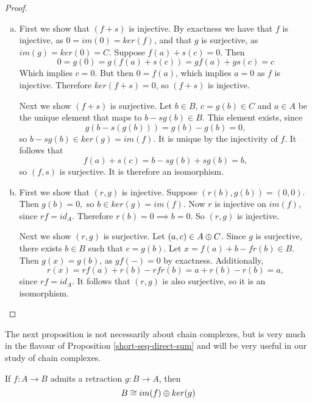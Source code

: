 \begin{proof}
\begin{enumerate}[(a)]
\item First we show that $(f+s)$ is injective. By exactness we have that $f$ is injective, as $0=im(0)=ker(f)$, and that $g$ is surjective, as $im(g)=ker(0)=C$. Suppose $f(a)+s(c)=0$. Then $$0=g(0)=g(f(a)+s(c))=gf(a)+gs(c)=c$$
Which implies $c=0$. But then $0=f(a)$, which implies $a=0$ as $f$ is injective. Therefore $ker(f+s)=0$, so $(f+s)$ is injective.

Next we show $(f+s)$ is surjective. Let $b\in B$, $c=g(b)\in C$ and $a\in A$ be the unique element that maps to $b-sg(b)\in B$. This element exists, since $$g(b-s(g(b)))=g(b)-g(b)=0,$$ so $b-sg(b)\in ker(g)=im(f)$. It is unique by the injectivity of $f$. It follows that $$f(a)+s(c)=b-sg(b)+sg(b)=b,$$ so $(f,s)$ is surjective. It is therefore an isomorphism.

\item First we show that $(r,g)$ is injective. Suppose $(r(b),g(b))=(0,0)$. Then $g(b)=0,$ so $b\in ker(g)=im(f)$. Now $r$ is injective on $im(f)$, since $rf=id_A$. Therefore $r(b)=0\implies b=0$. So $(r,g)$ is injective.

Next we show $(r,g)$ is surjective. Let $(a,c)\in A\oplus C$. Since $g$ is surjective, there exists $b\in B$ such that $c=g(b)$. Let $x=f(a)+b-fr(b)\in B$. Then $g(x)=g(b)$, as $gf(-)=0$ by exactness. Additionally, $$r(x)=rf(a)+r(b)-rfr(b)=a+r(b)-r(b)=a,$$
since $rf=id_A$. It follows that $(r,g)$ is also surjective, so it is an isomorphism.
\end{enumerate}

\end{proof}

The next proposition is not necessarily about chain complexes, but is very much in the flavour of Proposition \ref{short-seq-direct-sum} and will be very useful in our study of chain complexes.

\begin{proposition}\label{retraction-iso}
If $f:A\rightarrow B$ admits a retraction $g:B\rightarrow A$, then $$B\cong im(f)\oplus ker(g)$$
\end{proposition}

